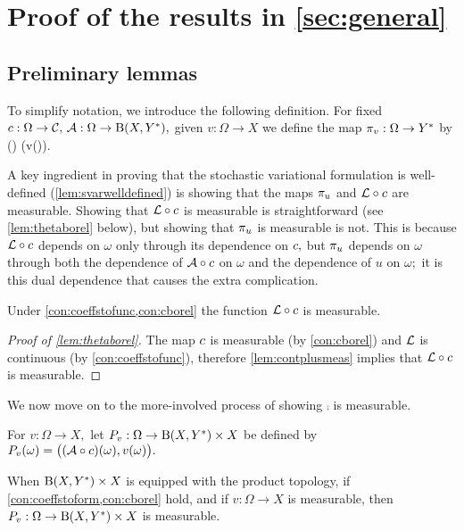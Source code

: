\section[Proof of the results in Section \MakeLowercase{\ref{sec:general}}]{Proof of the results in \cref{sec:general}}\label{sec:genproof}

\subsection{Preliminary lemmas}\label{sec:prelemmanary}
To simplify notation, we introduce the following definition.
For fixed $\coeff:\Omega\rightarrow\cC,\,\toform:\Omega\rightarrow\homspace,$ given $v:\Omega\rightarrow X$ we define the map $\pi_{v}:\Omega\rightarrow Y^{*}$ by
\beq\label{eq:comp}
\comp(\omega) \de \mleft[\mleft(\toform\circ\coeff\mright)(\omega)\mright]\mleft(v(\omega)\mright).
\eeq
\ede

A key ingredient in proving that the stochastic variational formulation is well-defined (\cref{lem:svarwelldefined}) is showing that the maps $\pi_{u}$ and $\mathcal L\circ c$ are measurable. Showing that $\mathcal L\circ c $ is measurable is straightforward (see \cref{lem:thetaborel} below), but showing that $\pi_{u}$ is measurable is not. This is because $\mathcal L\circ c$ depends on $\omega$ only through its dependence on $c,$ but $\pi_{u}$ depends on $\omega$ through both the dependence of $\mathcal A\circ c$ on $\omega$ and the dependence of $u$ on $\omega;$ it is this dual dependence that causes the extra complication.

 \label{lem:thetaborel}
Under \cref{con:coeffstofunc,con:cborel} the function $\mathcal L\circ c$ is measurable.
\ele

\begin{proof}[Proof of \cref{lem:thetaborel}]
The map $c$ is measurable (by \cref{con:cborel})
  and $\mathcal L$ is continuous  (by \cref{con:coeffstofunc}), therefore \cref{lem:contplusmeas} implies that $\mathcal L\circ c $ is measurable.
\end{proof}

We now move on to the more-involved process of showing $\comp$ is measurable.

For $v:\Omega\rightarrow X,$ let $\toprod:\Omega\rightarrow \homspace \times X$ be defined by $\toprod(\omega) = \big(\mleft(\toform\circ\coeff\mright)(\omega),v(\omega)\big).$
\ede

\label{lem:Pmeas}
When $\homspace \times X$ is equipped with the product topology,  if \cref{con:coeffstoform,con:cborel} hold, and if $v:\Omega\rightarrow X$ is measurable, then $\toprod:\Omega\rightarrow \homspace\times X$ is measurable.
\ele

